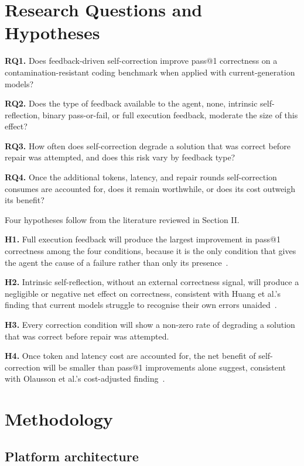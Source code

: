 \documentclass[conference]{IEEEtran}
\begin{document}
\section{Research Questions and Hypotheses}

\textbf{RQ1.} Does feedback-driven self-correction improve pass@1 correctness on a contamination-resistant coding benchmark when applied with current-generation models?

\textbf{RQ2.} Does the type of feedback available to the agent, none, intrinsic self-reflection, binary pass-or-fail, or full execution feedback, moderate the size of this effect?

\textbf{RQ3.} How often does self-correction degrade a solution that was correct before repair was attempted, and does this risk vary by feedback type?

\textbf{RQ4.} Once the additional tokens, latency, and repair rounds self-correction consumes are accounted for, does it remain worthwhile, or does its cost outweigh its benefit?

Four hypotheses follow from the literature reviewed in Section II.

\textbf{H1.} Full execution feedback will produce the largest improvement in pass@1 correctness among the four conditions, because it is the only condition that gives the agent the cause of a failure rather than only its presence~\cite{chen2024}.

\textbf{H2.} Intrinsic self-reflection, without an external correctness signal, will produce a negligible or negative net effect on correctness, consistent with Huang et al.'s finding that current models struggle to recognise their own errors unaided~\cite{huang2024}.

\textbf{H3.} Every correction condition will show a non-zero rate of degrading a solution that was correct before repair was attempted.

\textbf{H4.} Once token and latency cost are accounted for, the net benefit of self-correction will be smaller than pass@1 improvements alone suggest, consistent with Olausson et al.'s cost-adjusted finding~\cite{olausson2024}.

\section{Methodology}

\subsection{Platform architecture}
\end{document}
